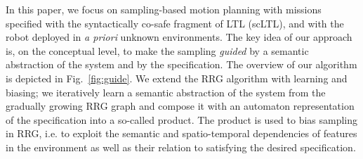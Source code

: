 


In this paper, we focus on sampling-based motion planning with missions specified with the syntactically co-safe fragment of LTL (scLTL), and with the robot deployed in \emph{a priori} unknown environments.
The key idea of our approach is, on the conceptual level, to make the sampling \emph{guided} by a semantic abstraction of the system and by the specification. 
The overview of our algorithm is depicted in Fig.~\ref{fig:guide}. We extend the RRG algorithm with learning and biasing; we iteratively learn a semantic abstraction of the system from the gradually growing RRG graph and compose it with an automaton representation of the specification into a so-called product. The product is used to bias sampling in RRG, i.e. to exploit the semantic and spatio-temporal dependencies of features in the environment as well as their relation to satisfying the desired specification.

